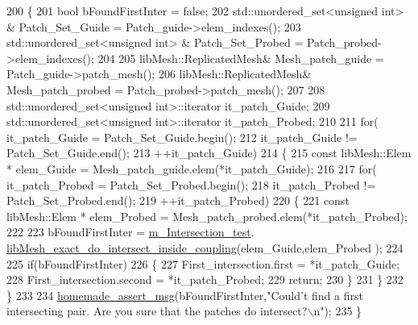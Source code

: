 \begin{DoxyCode}
200     \{
201         \textcolor{keywordtype}{bool} bFoundFirstInter = \textcolor{keyword}{false};
202         std::unordered\_set<unsigned int> & Patch\_Set\_Guide = Patch\_guide->elem\_indexes();
203         std::unordered\_set<unsigned int> & Patch\_Set\_Probed = Patch\_probed->elem\_indexes();
204 
205         libMesh::ReplicatedMesh&        Mesh\_patch\_guide    = Patch\_guide->patch\_mesh();
206         libMesh::ReplicatedMesh&        Mesh\_patch\_probed   = Patch\_probed->patch\_mesh();
207 
208         std::unordered\_set<unsigned int>::iterator it\_patch\_Guide;
209         std::unordered\_set<unsigned int>::iterator it\_patch\_Probed;
210 
211         \textcolor{keywordflow}{for}(    it\_patch\_Guide =  Patch\_Set\_Guide.begin();
212                 it\_patch\_Guide != Patch\_Set\_Guide.end();
213                 ++it\_patch\_Guide)
214         \{
215             \textcolor{keyword}{const} libMesh::Elem * elem\_Guide = Mesh\_patch\_guide.elem(*it\_patch\_Guide);
216 
217             \textcolor{keywordflow}{for}(    it\_patch\_Probed =  Patch\_Set\_Probed.begin();
218                     it\_patch\_Probed != Patch\_Set\_Probed.end();
219                     ++it\_patch\_Probed)
220             \{
221                 \textcolor{keyword}{const} libMesh::Elem * elem\_Probed = Mesh\_patch\_probed.elem(*it\_patch\_Probed);
222 
223                 bFoundFirstInter = \hyperlink{classcarl_1_1_intersection___search_afeedb5ff9144638151b7f956cf113fc4}{m\_Intersection\_test}.
      \hyperlink{classcarl_1_1_intersection___tools_a98929a97acb94aa77fc8952d80993d88}{libMesh\_exact\_do\_intersect\_inside\_coupling}(elem\_Guide,elem\_Probed
      );
224 
225                 \textcolor{keywordflow}{if}(bFoundFirstInter)
226                 \{
227                     First\_intersection.first = *it\_patch\_Guide;
228                     First\_intersection.second = *it\_patch\_Probed;
229                     \textcolor{keywordflow}{return};
230                 \}
231             \}
232         \}
233 
234         \hyperlink{common__header_8h_a593ccc80b790b2268653fcf6597bf451}{homemade\_assert\_msg}(bFoundFirstInter,\textcolor{stringliteral}{"Could't find a first intersecting pair.
       Are you sure that the patches do intersect?\(\backslash\)n"});
235     \}
\end{DoxyCode}
\hypertarget{classcarl_1_1_intersection___search_a00e012de151310737c771ee7b15c9b2c}{}
